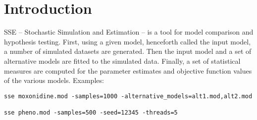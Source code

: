 



\maketitle


\section{Introduction}


SSE – Stochastic Simulation and Estimation – is a tool for model comparison and hypothesis testing. First, using a given model, henceforth called the input model, a number of simulated datasets are generated. Then the input model and a set of alternative models are fitted to the simulated data. Finally, a set of statistical measures are computed for the parameter estimates and objective function values of the various models. Examples:
\begin{verbatim}
sse moxonidine.mod -samples=1000 -alternative_models=alt1.mod,alt2.mod

sse pheno.mod -samples=500 -seed=12345 -threads=5
\end{verbatim}

